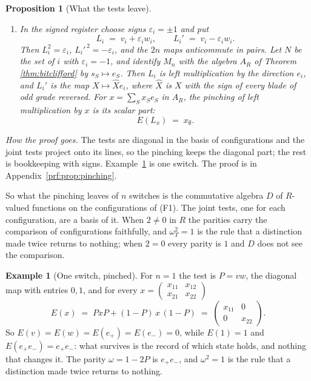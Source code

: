 \documentclass[11pt]{article}
\theoremstyle{plain}
\theoremstyle{definition}
\newtheorem{example}{Example}
\theoremstyle{plain}
\newtheorem{proposition}[theorem]{Proposition}
\theoremstyle{definition}
\begin{document}
\begin{proposition}[What the tests leave]
\begin{enumerate}
\item[(vi)] In the signed register choose signs $\varepsilon_{i} = \pm 1$ and put
\[
L_{i} \;=\; v_{i} + \varepsilon_{i}w_{i}, \qquad L_{i}' \;=\; v_{i} - \varepsilon_{i}w_{i} .
\]
Then $L_{i}^{2} = \varepsilon_{i}$, $L_{i}'^{\,2} = -\varepsilon_{i}$, and the $2n$ maps anticommute in pairs. Let $N$ be the set of $i$ with $\varepsilon_{i} = -1$, and identify $M_{n}$ with the algebra $A_{R}$ of Theorem \ref{thm:bitclifford} by $s_{S} \mapsto e_{S}$. Then $L_{i}$ is left multiplication by the direction $e_{i}$, and $L_{i}'$ is the map $X \mapsto \hat{X}e_{i}$, where $\hat{X}$ is $X$ with the sign of every blade of odd grade reversed. For $x = \sum_{S}x_{S}e_{S}$ in $A_{R}$, the pinching of left multiplication by $x$ is its scalar part:
\[
E(L_{x}) \;=\; x_{\emptyset} .
\]
\end{enumerate}
\end{proposition}

\noindent\emph{How the proof goes.} The tests are diagonal in the basis of configurations and the joint tests project onto its lines, so the pinching keeps the diagonal part; the rest is bookkeeping with signs. Example~\ref{ex:pinch} is one switch. The proof is in Appendix~\ref{prf:prop:pinching}.

So what the pinching leaves of $n$ switches is the commutative algebra $D$ of $R$-valued functions on the configurations of (F1). The joint tests, one for each configuration, are a basis of it. When $2 \neq 0$ in $R$ the parities carry the comparison of configurations faithfully, and $\omega_{T}^{2} = 1$ is the rule that a distinction made twice returns to nothing; when $2 = 0$ every parity is $1$ and $D$ does not see the comparison.

\begin{example}[One switch, pinched]\label{ex:pinch}
For $n = 1$ the test is $P = vw$, the diagonal map with entries $0, 1$, and for every $x = \begin{pmatrix} x_{11} & x_{12} \\ x_{21} & x_{22} \end{pmatrix}$
\[
E(x) \;=\; PxP + (1 - P)\,x\,(1 - P) \;=\; \begin{pmatrix} x_{11} & 0 \\ 0 & x_{22} \end{pmatrix} .
\]
So $E(v) = E(w) = E(e_{+}) = E(e_{-}) = 0$, while $E(1) = 1$ and $E(e_{+}e_{-}) = e_{+}e_{-}$: what survives is the record of which state holds, and nothing that changes it. The parity $\omega = 1 - 2P$ is $e_{+}e_{-}$, and $\omega^{2} = 1$ is the rule that a distinction made twice returns to nothing.
\end{example}
\end{document}
